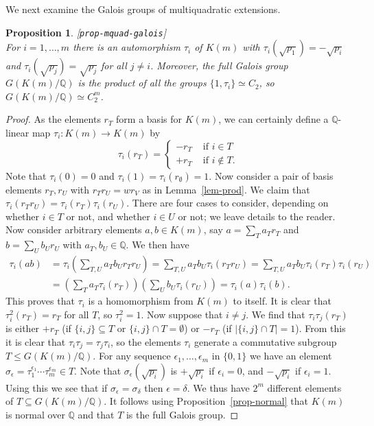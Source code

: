 \documentclass{amsart}
\newcommand{\lbl}[1]{\label{#1}\textup{[\texttt{#1}]}\ \\}
\newcommand{\lbl}{\label}
\newcommand{\Q}         {{\mathbb{Q}}}
\newcommand{\dl}        {\delta}
\newcommand{\ep}        {\epsilon}
\newcommand{\sg}        {\sigma}
\newcommand{\sse}       {\subseteq}
\renewcommand{\:}{\colon}
\newtheorem{proposition}[theorem]{Proposition}
\theoremstyle{definition}
\begin{document}
We next examine the Galois groups of multiquadratic extensions.
\begin{proposition}\lbl{prop-mquad-galois}
 For $i=1,\dotsc,m$ there is an automorphism $\tau_i$ of $K(m)$ with
 $\tau_i(\sqrt{p_1})=-\sqrt{p_i}$ and $\tau_i(\sqrt{p_j})=\sqrt{p_j}$
 for all $j\neq i$.  Moreover, the full Galois group $G(K(m)/\Q)$ is
 the product of all the groups $\{1,\tau_i\}\simeq C_2$, so
 $G(K(m)/\Q)\simeq C_2^m$.
\end{proposition}
\begin{proof}
 As the elements $r_T$ form a basis for $K(m)$, we can certainly
 define a $\Q$-linear map $\tau_i\:K(m)\to K(m)$ by 
 \[ \tau_i(r_T) =
      \begin{cases} -r_T & \text{ if } i\in T \\
                    +r_T & \text{ if } i\not\in T. \end{cases}
 \]
 Note that $\tau_i(0)=0$ and $\tau_i(1)=\tau_i(r_\emptyset)=1$.  Now
 consider a pair of basis elements $r_T,r_U$ with $r_Tr_U=wr_V$ as in
 Lemma~\ref{lem-prod}.  We claim that
 $\tau_i(r_Tr_U)=\tau_i(r_T)\tau_i(r_U)$.  There are four cases to
 consider, depending on whether $i\in T$ or not, and whether $i\in U$
 or not; we leave details to the reader.  Now consider arbitrary
 elements $a,b\in K(m)$, say $a=\sum_Ta_Tr_T$ and $b=\sum_Ub_Ur_U$
 with $a_T,b_U\in\Q$.  We then have 
 \begin{align*}
   \tau_i(ab) &= \tau_i\left(\sum_{T,U}a_Tb_Ur_Tr_U\right) = 
     \sum_{T,U}a_Tb_U\tau_i(r_Tr_U) = 
     \sum_{T,U}a_Tb_U\tau_i(r_T)\tau_i(r_U) \\
   &= \left(\sum_Ta_T\tau_i(r_T)\right)\left(\sum_Ub_U\tau_i(r_U)\right)
     = \tau_i(a)\tau_i(b).
 \end{align*}
 This proves that $\tau_i$ is a homomorphism from $K(m)$ to itself.
 It is clear that $\tau_i^2(r_T)=r_T$ for all $T$, so $\tau_i^2=1$.
 Now suppose that $i\neq j$.  We find that $\tau_i\tau_j(r_T)$ is
 either $+r_T$ (if $\{i,j\}\sse T$ or $\{i,j\}\cap T=\emptyset$) or
 $-r_T$ (if $|\{i,j\}\cap T|=1$).  From this it is clear that
 $\tau_i\tau_j=\tau_j\tau_i$, so the elements $\tau_i$ generate a
 commutative subgroup $T\leq G(K(m)/\Q)$.  For any sequence
 $\ep_1,\dotsc,\ep_m$ in $\{0,1\}$ we have an element
 $\sg_{\ep}=\tau_1^{\ep_1}\dotsb\tau_m^{\ep_m}\in T$.  Note that
 $\sg_\ep(\sqrt{p_i})$ is $+\sqrt{p_i}$ if $\ep_i=0$, and
 $-\sqrt{p_i}$ if $\ep_i=1$.  Using this we see that if
 $\sg_\ep=\sg_\dl$ then $\ep=\dl$.  We thus have $2^m$ different
 elements of $T\sse G(K(m)/\Q)$.  It follows using
 Proposition~\ref{prop-normal} that $K(m)$ is normal over $\Q$ and
 that $T$ is the full Galois group.
\end{proof}
\end{document}
